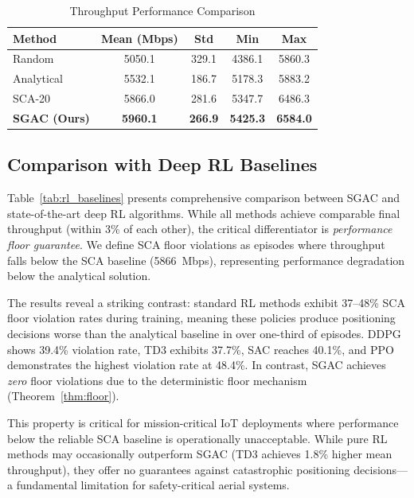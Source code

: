 \documentclass[journal]{IEEEtran}
\begin{document}
\begin{table}[t]
\centering
\caption{Throughput Performance Comparison}
\label{tab:throughput}
\begin{tabular}{lcccc}
\toprule
\textbf{Method} & \textbf{Mean (Mbps)} & \textbf{Std} & \textbf{Min} & \textbf{Max} \\
\midrule
Random & 5050.1 & 329.1 & 4386.1 & 5860.3 \\
Analytical & 5532.1 & 186.7 & 5178.3 & 5883.2 \\
SCA-20 & 5866.0 & 281.6 & 5347.7 & 6486.3 \\
\midrule
\textbf{SGAC (Ours)} & \textbf{5960.1} & \textbf{266.9} & \textbf{5425.3} & \textbf{6584.0} \\
\bottomrule
\end{tabular}
\end{table}

\subsection{Comparison with Deep RL Baselines}

Table~\ref{tab:rl_baselines} presents comprehensive comparison between SGAC and state-of-the-art deep RL algorithms. While all methods achieve comparable final throughput (within 3\% of each other), the critical differentiator is \textit{performance floor guarantee}. We define SCA floor violations as episodes where throughput falls below the SCA baseline (5866~Mbps), representing performance degradation below the analytical solution.

The results reveal a striking contrast: standard RL methods exhibit 37--48\% SCA floor violation rates during training, meaning these policies produce positioning decisions worse than the analytical baseline in over one-third of episodes. DDPG shows 39.4\% violation rate, TD3 exhibits 37.7\%, SAC reaches 40.1\%, and PPO demonstrates the highest violation rate at 48.4\%. In contrast, SGAC achieves \textit{zero} floor violations due to the deterministic floor mechanism (Theorem~\ref{thm:floor}).

This property is critical for mission-critical IoT deployments where performance below the reliable SCA baseline is operationally unacceptable. While pure RL methods may occasionally outperform SGAC (TD3 achieves 1.8\% higher mean throughput), they offer no guarantees against catastrophic positioning decisions---a fundamental limitation for safety-critical aerial systems.
\end{document}
